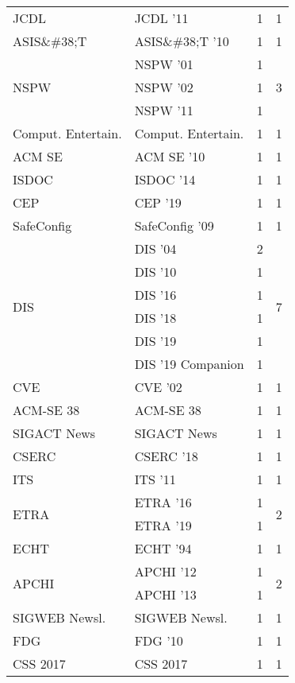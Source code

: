 \begin{table*}[t]
\begin{tabular}{llrr}
\multirow{1}{*}{JCDL } & JCDL '11 & 1 & \multirow{1}{*}{1}\\
\multirow{1}{*}{ASIS\&\#38;T } & ASIS\&\#38;T '10 & 1 & \multirow{1}{*}{1}\\
\multirow{3}{*}{NSPW } & NSPW '01 & 1 & \multirow{3}{*}{3}\\
& NSPW '02 & 1 &\\
& NSPW '11 & 1 &\\
\multirow{1}{*}{Comput. Entertain.} & Comput. Entertain. & 1 & \multirow{1}{*}{1}\\
\multirow{1}{*}{ACM SE } & ACM SE '10 & 1 & \multirow{1}{*}{1}\\
\multirow{1}{*}{ISDOC } & ISDOC '14 & 1 & \multirow{1}{*}{1}\\
\multirow{1}{*}{CEP } & CEP '19 & 1 & \multirow{1}{*}{1}\\
\multirow{1}{*}{SafeConfig } & SafeConfig '09 & 1 & \multirow{1}{*}{1}\\
\multirow{6}{*}{DIS } & DIS '04 & 2 & \multirow{6}{*}{7}\\
& DIS '10 & 1 &\\
& DIS '16 & 1 &\\
& DIS '18 & 1 &\\
& DIS '19 & 1 &\\
& DIS '19 Companion & 1 &\\
\multirow{1}{*}{CVE } & CVE '02 & 1 & \multirow{1}{*}{1}\\
\multirow{1}{*}{ACM-SE 38} & ACM-SE 38 & 1 & \multirow{1}{*}{1}\\
\multirow{1}{*}{SIGACT News} & SIGACT News & 1 & \multirow{1}{*}{1}\\
\multirow{1}{*}{CSERC } & CSERC '18 & 1 & \multirow{1}{*}{1}\\
\multirow{1}{*}{ITS } & ITS '11 & 1 & \multirow{1}{*}{1}\\
\multirow{2}{*}{ETRA } & ETRA '16 & 1 & \multirow{2}{*}{2}\\
& ETRA '19 & 1 &\\
\multirow{1}{*}{ECHT } & ECHT '94 & 1 & \multirow{1}{*}{1}\\
\multirow{2}{*}{APCHI } & APCHI '12 & 1 & \multirow{2}{*}{2}\\
& APCHI '13 & 1 &\\
\multirow{1}{*}{SIGWEB Newsl.} & SIGWEB Newsl. & 1 & \multirow{1}{*}{1}\\
\multirow{1}{*}{FDG } & FDG '10 & 1 & \multirow{1}{*}{1}\\
\multirow{1}{*}{CSS 2017} & CSS 2017 & 1 & \multirow{1}{*}{1}\\

\end{tabular}
\end{table*}
